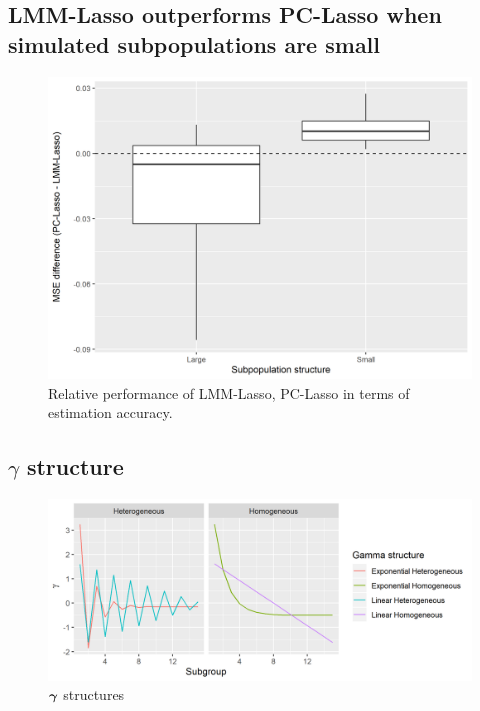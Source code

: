 \subsection{LMM-Lasso outperforms PC-Lasso when simulated subpopulations are small}
\begin{figure}[H]
    \centering
    \includegraphics[scale = 0.7]{figures/fig2a}
    \caption{Relative performance of LMM-Lasso, PC-Lasso in terms of estimation accuracy.}
    \label{fig:big_vs_small}
\end{figure}

\subsection{$\gamma$ structure}
\begin{figure}[H]
    \centering
    \includegraphics[scale = 0.7]{figures/gamma_structure.png}
    \caption{$\boldsymbol{\gamma}$ structures}
    \label{fig:gamma_structures}
\end{figure}


